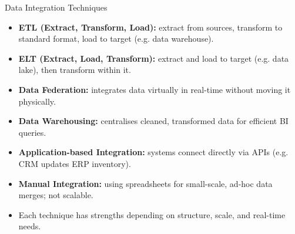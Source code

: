 \documentclass[aspectratio=169, table]{beamer}
\begin{document}
\begin{frame}{Data Integration Techniques}
	\vspace{20pt}
	
	\begin{itemize}
		\item \textbf{ETL (Extract, Transform, Load):} extract from sources, transform to standard format, load to target (e.g. data warehouse).
		
		\item \textbf{ELT (Extract, Load, Transform):} extract and load to target (e.g. data lake), then transform within it.
		
		\item \textbf{Data Federation:} integrates data virtually in real-time without moving it physically.
		
		\item \textbf{Data Warehousing:} centralises cleaned, transformed data for efficient BI queries.
		
		\item \textbf{Application-based Integration:} systems connect directly via APIs (e.g. CRM updates ERP inventory).
		
		\item \textbf{Manual Integration:} using spreadsheets for small-scale, ad-hoc data merges; not scalable.
		
		\item Each technique has strengths depending on structure, scale, and real-time needs.
	\end{itemize}
	
\end{frame}
\end{document}
